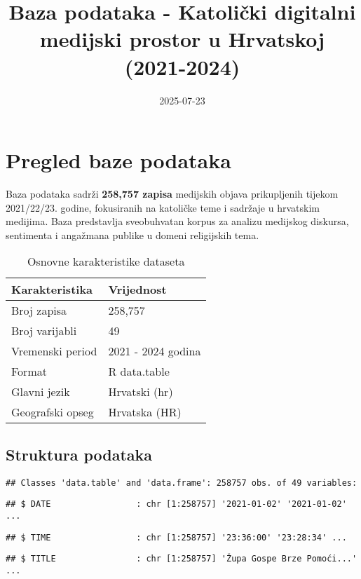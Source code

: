 \documentclass[
]{article}
\title{Baza podataka - Katolički digitalni medijski prostor u Hrvatskoj
(2021-2024)}
\author{}
\date{\vspace{-2.5em}2025-07-23}
\begin{document}
\maketitle

{
\setcounter{tocdepth}{2}
\tableofcontents
}
\section{Pregled baze podataka}\label{pregled-baze-podataka}

Baza podataka sadrži \textbf{258,757 zapisa} medijskih objava
prikupljenih tijekom 2021/22/23. godine, fokusiranih na katoličke teme i
sadržaje u hrvatskim medijima. Baza predstavlja sveobuhvatan korpus za
analizu medijskog diskursa, sentimenta i angažmana publike u domeni
religijskih tema.

\begin{longtable}[t]{ll}
\caption{\label{tab:load-data}Osnovne karakteristike dataseta}\\
\toprule
Karakteristika & Vrijednost\\
\midrule
Broj zapisa & 258,757\\
Broj varijabli & 49\\
Vremenski period & 2021 - 2024 godina\\
Format & R data.table\\
Glavni jezik & Hrvatski (hr)\\
\addlinespace
Geografski opseg & Hrvatska (HR)\\
\bottomrule
\end{longtable}

\subsection{Struktura podataka}\label{struktura-podataka}

\begin{verbatim}
## Classes 'data.table' and 'data.frame': 258757 obs. of 49 variables:
\end{verbatim}

\begin{verbatim}
## $ DATE                 : chr [1:258757] '2021-01-02' '2021-01-02' ...
\end{verbatim}

\begin{verbatim}
## $ TIME                 : chr [1:258757] '23:36:00' '23:28:34' ...
\end{verbatim}

\begin{verbatim}
## $ TITLE                : chr [1:258757] 'Župa Gospe Brze Pomoći...' ...
\end{verbatim}
\end{document}
